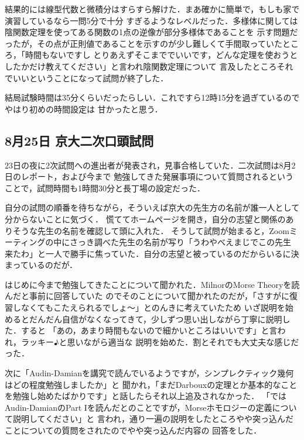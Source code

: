 \documentclass[dvipdfmx,uplatex]{jsarticle}
\begin{document}
結果的には線型代数と微積分はすらすら解けた．まあ確かに簡単で，もしも家で演習しているなら一問5分で十分
すぎるようなレベルだった．多様体に関しては陰関数定理を使ってある関数の1点の逆像が部分多様体であることを
示す問題だったが，その点が正則値であることを示すのが少し難しくて手間取っていたところ，「時間もないですし
とりあえずそこまででいいです，どんな定理を使おうとしたかだけ教えてください」と言われ陰関数定理について
言及したところそれでいいということになって試問が終了した．

結局試験時間は35分くらいだったらしい．これですら12時15分を過ぎているのでやはり初めの時間設定は
甘かったと思う．

\subsection{8月25日 京大二次口頭試問}
23日の夜に2次試問への進出者が発表され，見事合格していた．二次試問は8月2日のレポート，および今まで
勉強してきた発展事項について質問されるということで，試問時間も1時間30分と長丁場の設定だった．

自分の試問の順番を待ちながら，そういえば京大の先生方の名前が誰一人として分からないことに気づく．
慌ててホームページを開き，自分の志望と関係のありそうな先生の名前を確認して頭に入れた．
そうして試問が始まると，Zoomミーティングの中にさっき調べた先生の名前が写り「うわやべえまじでこの先生
来たわ」と一人で勝手に焦っていた．自分の志望と被っているのだからいるに決まっているのだが．

はじめに今まで勉強してきたことについて聞かれた．MilnorのMorse Theoryを読んだと事前に回答していた
のでそのことについて聞かれたのだが，「さすがに復習しなくてもこたえられるでしょ～」とのんきに考えていたため
いざ説明を始めるとだんだん自信がなくなってきて，少しずつ思い出しながら丁寧に説明した．すると
「あの，あまり時間もないので細かいところはいいです」と言われ，ラッキー♪と思いながら適当な
説明を始めた．割とそれでも大丈夫な感じだった．

次に「Audin-Damianを講究で読んでいるようですが，シンプレクティック幾何はどの程度勉強しましたか」と
聞かれ，「まだDarbouxの定理とか基本的なことを勉強し始めたばかりです」と話したらそれ以上追及されなかった．
「ではAudin-DamianのPart Iを読んだとのことですが，Morseホモロジーの定義について説明してください」と
言われ，通り一遍の説明をしたところやや突っ込んだことについての質問をされたのでやや突っ込んだ内容の
回答をした．
\end{document}
